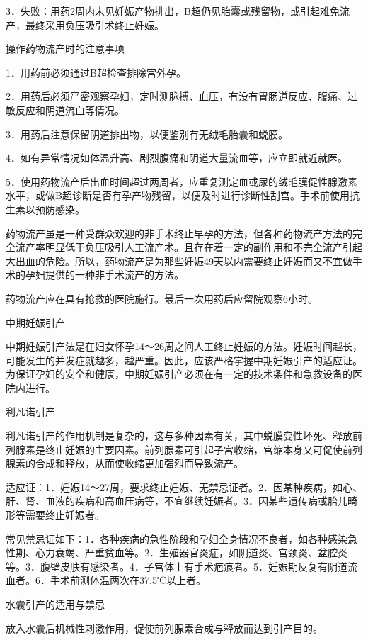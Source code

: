 \documentclass[12pt,UTF8]{ctexbook}
\begin{document}
3．失败：用药2周内未见妊娠产物排出，B超仍见胎囊或残留物，或引起难免流产，最终采用负压吸引术终止妊娠。





操作药物流产时的注意事项


1．用药前必须通过B超检查排除宫外孕。

2．用药后必须严密观察孕妇，定时测脉搏、血压，有没有胃肠道反应、腹痛、过敏反应和阴道流血等情况。

3．用药后注意保留阴道排出物，以便鉴别有无绒毛胎囊和蜕膜。

4．如有异常情况如体温升高、剧烈腹痛和阴道大量流血等，应立即就近就医。

5．使用药物流产后出血时间超过两周者，应重复测定血或尿的绒毛膜促性腺激素水平，或做B超诊断是否有孕产物残留，以便及时进行诊断性刮宫。手术前使用抗生素以预防感染。

药物流产虽是一种受群众欢迎的非手术终止早孕的方法，但各种药物流产方法的完全流产率明显低于负压吸引人工流产术。且存在着一定的副作用和不完全流产引起大出血的危险。所以，药物流产是为那些妊娠49天以内需要终止妊娠而又不宜做手术的孕妇提供的一种非手术流产的方法。

药物流产应在具有抢救的医院施行。最后一次用药后应留院观察6小时。





中期妊娠引产


中期妊娠引产法是在妇女怀孕14～26周之间人工终止妊娠的方法。妊娠时间越长，可能发生的并发症就越多，越严重。因此，应该严格掌握中期妊娠引产的适应证。为保证孕妇的安全和健康，中期妊娠引产必须在有一定的技术条件和急救设备的医院内进行。

利凡诺引产

利凡诺引产的作用机制是复杂的，这与多种因素有关，其中蜕膜变性坏死、释放前列腺素是终止妊娠的主要因素。前列腺素可引起子宫收缩，宫缩本身又可促使前列腺素的合成和释放，从而使收缩更加强烈而导致流产。

适应证：1．妊娠14～27周，要求终止妊娠、无禁忌证者。2．因某种疾病，如心、肝、肾、血液的疾病和高血压病等，不宜继续妊娠者。3．因某些遗传病或胎儿畸形等需要终止妊娠者。

常见禁忌证如下：1．各种疾病的急性阶段和孕妇全身情况不良者，如各种感染急性期、心力衰竭、严重贫血等。2．生殖器官炎症，如阴道炎、宫颈炎、盆腔炎等。3．腹壁皮肤有感染者。4．子宫体上有手术疤痕者。5．妊娠期反复有阴道流血者。6．手术前测体温两次在37.5℃以上者。

水囊引产的适用与禁忌

放入水囊后机械性刺激作用，促使前列腺素合成与释放而达到引产目的。
\end{document}
